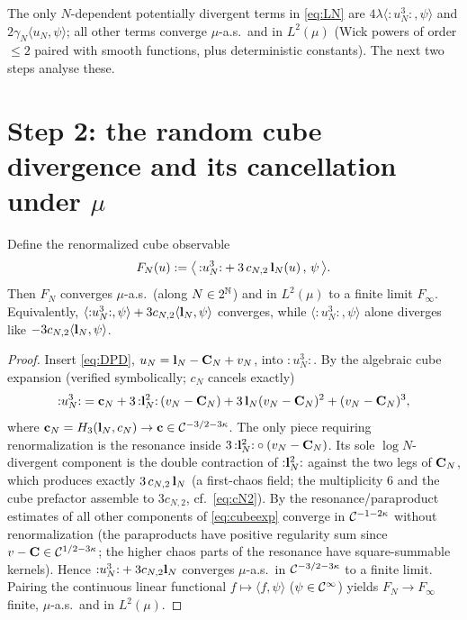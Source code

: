 \medskip
The only $N$-dependent potentially divergent terms in \eqref{eq:LN} are
$4\lambda\langle{:}u_N^3{:},\psi\rangle$ and $2\gamma_N\langle u_N,\psi\rangle$; all
other terms converge $\mu$-a.s.\ and in $L^2(\mu)$ (Wick powers of order $\le2$ paired
with smooth functions, plus deterministic constants). The next two steps analyse these.

\section*{Step 2: the random cube divergence and its cancellation under $\mu$}

\begin{qonelemma}\label{lem:cancel}
Define the renormalized cube observable
\begin{equation}\label{eq:FN}
F_N(u):=\bigl\langle\,{:}u_N^3{:}+3\,c_{N,2}\,\mathbf{l}_N(u)\,,\,\psi\,\bigr\rangle .
\end{equation}
Then $F_N$ converges $\mu$-a.s.\ (along $N\in2^{\mathbb{N}}$) and in $L^2(\mu)$ to a finite
limit $F_\infty$. Equivalently, $\langle{:}u_N^3{:},\psi\rangle+3c_{N,2}\langle\mathbf{l}_N,\psi\rangle$
converges, while $\langle{:}u_N^3{:},\psi\rangle$ alone diverges like
$-3c_{N,2}\langle\mathbf{l}_N,\psi\rangle$.
\end{qonelemma}
\begin{proof}
Insert \eqref{eq:DPD}, $u_N=\mathbf{l}_N-\mathbf{C}_N+v_N$, into ${:}u_N^3{:}$. By the
algebraic cube expansion (verified symbolically; $c_N$ cancels exactly)
\begin{equation}\label{eq:cubeexp}
{:}u_N^3{:}=\mathbf{c}_N+3\,{:}\mathbf{l}_N^2{:}\,(v_N-\mathbf{C}_N)+3\,\mathbf{l}_N(v_N-\mathbf{C}_N)^2+(v_N-\mathbf{C}_N)^3,
\end{equation}
where $\mathbf{c}_N=H_3(\mathbf{l}_N,c_N)\to\mathbf{c}\in\mathcal{C}^{-3/2-3\kappa}$. The only
piece requiring renormalization is the resonance inside
$3\,{:}\mathbf{l}_N^2{:}\circ(v_N-\mathbf{C}_N)$. Its sole $\log N$-divergent component is
the double contraction of ${:}\mathbf{l}_N^2{:}$ against the two legs of $\mathbf{C}_N$,
which produces exactly $3\,c_{N,2}\,\mathbf{l}_N$ (a first-chaos field; the multiplicity
$6$ and the cube prefactor assemble to $3c_{N,2}$, cf.\ \eqref{eq:cN2}). By the
resonance/paraproduct estimates of \cite{CC18,GIP15} all other components of
\eqref{eq:cubeexp} converge in $\mathcal{C}^{-1-2\kappa}$ without renormalization (the
paraproducts have positive regularity sum since $v-\mathbf{C}\in\mathcal{C}^{1/2-3\kappa}$; the
higher chaos parts of the resonance have square-summable kernels). Hence
${:}u_N^3{:}+3c_{N,2}\mathbf{l}_N$ converges $\mu$-a.s.\ in $\mathcal{C}^{-3/2-3\kappa}$ to a
finite limit. Pairing the continuous linear functional $f\mapsto\langle f,\psi\rangle$
($\psi\in\mathcal{C}^\infty$) yields $F_N\to F_\infty$ finite, $\mu$-a.s.\ and in $L^2(\mu)$.
\end{proof}

